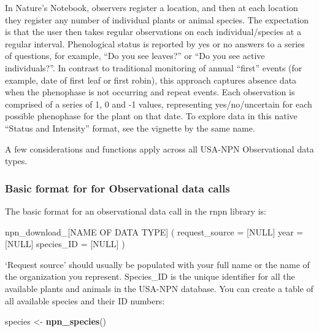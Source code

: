 \documentclass[]{book}
\newenvironment{Shaded}{\begin{snugshade}}{\end{snugshade}}
\newcommand{\DataTypeTok}[1]{\textcolor[rgb]{0.13,0.29,0.53}{#1}}
\newcommand{\KeywordTok}[1]{\textcolor[rgb]{0.13,0.29,0.53}{\textbf{#1}}}
\newcommand{\NormalTok}[1]{#1}
\newcommand{\OtherTok}[1]{\textcolor[rgb]{0.56,0.35,0.01}{#1}}
\newcommand{\StringTok}[1]{\textcolor[rgb]{0.31,0.60,0.02}{#1}}
\begin{document}
In Nature's Notebook, observers register a location, and then at each location they register any number of individual plants or animal species. The expectation is that the user then takes regular observations on each individual/species at a regular interval. Phenological status is reported by yes or no answers to a series of questions, for example, ``Do you see leaves?'' or ``Do you see active individuals?''. In contrast to traditional monitoring of annual ``first'' events (for example, date of first leaf or first robin), this approach captures absence data when the phenophase is not occurring and repeat events. Each observation is comprised of a series of 1, 0 and -1 values, representing yes/no/uncertain for each possible phenophase for the plant on that date. To explore data in this native ``Status and Intensity'' format, see the vignette by the same name.

A few considerations and functions apply across all USA-NPN Observational data types.

\hypertarget{basic-format-for-for-observational-data-calls}{%
\subsubsection{Basic format for for Observational data calls}\label{basic-format-for-for-observational-data-calls}}

The basic format for an observational data call in the rnpn library is:

\begin{Shaded}
\begin{Highlighting}[]
\NormalTok{npn_download_[NAME OF DATA TYPE] (}
  \DataTypeTok{request_source =}\NormalTok{ [}\OtherTok{NULL}\NormalTok{]}
  \DataTypeTok{year =}\NormalTok{  [}\OtherTok{NULL}\NormalTok{]}
  \DataTypeTok{species_ID =}\NormalTok{ [}\OtherTok{NULL}\NormalTok{]}
\NormalTok{)                  }
\end{Highlighting}
\end{Shaded}

`Request source' should usually be populated with your full name or the name of the organization you represent. Species\_ID is the unique identifier for all the available plants and animals in the USA-NPN database.
You can create a table of all available species and their ID numbers:

\begin{Shaded}
\begin{Highlighting}[]
\NormalTok{species <-}\StringTok{ }\KeywordTok{npn_species}\NormalTok{()}
\end{Highlighting}
\end{Shaded}
\end{document}

